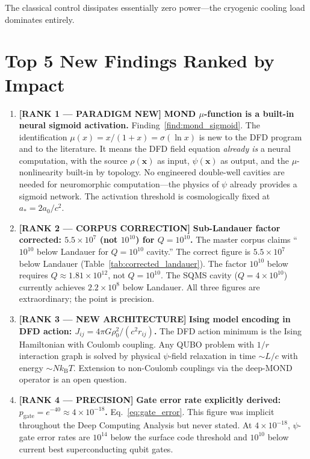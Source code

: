 \documentclass[11pt]{article}
\theoremstyle{definition}
\theoremstyle{remark}
\newcommand{\kB}{k_{\mathrm{B}}}
\begin{document}
The classical control dissipates essentially zero power---the cryogenic
cooling load dominates entirely.

\section{Top 5 New Findings Ranked by Impact}
\label{sec:top5}

\begin{enumerate}

\item \textbf{[RANK 1 --- PARADIGM NEW]} \textbf{MOND $\mu$-function
is a built-in neural sigmoid activation.}
Finding~\ref{find:mond_sigmoid}. The identification $\mu(x) = x/(1+x)
= \sigma(\ln x)$ is new to the DFD program and to the literature. It
means the DFD field equation \emph{already is} a neural computation,
with the source $\rho(\mathbf{x})$ as input, $\psi(\mathbf{x})$ as
output, and the $\mu$-nonlinearity built-in by topology. No engineered
double-well cavities are needed for neuromorphic computation---the
physics of $\psi$ already provides a sigmoid network. The activation
threshold is cosmologically fixed at $a_* = 2a_0/c^2$.

\item \textbf{[RANK 2 --- CORPUS CORRECTION]} \textbf{Sub-Landauer
factor corrected: $5.5\times 10^7$ (not $10^{10}$) for $Q = 10^{10}$.}
The master corpus claims ``$10^{10}$ below Landauer for $Q = 10^{10}$
cavity.'' The correct figure is $5.5\times 10^7$ below Landauer
(Table~\ref{tab:corrected_landauer}). The factor $10^{10}$ below
requires $Q \approx 1.81\times 10^{12}$, not $Q = 10^{10}$. The
SQMS cavity ($Q = 4\times 10^{10}$) currently achieves $2.2\times 10^8$
below Landauer. All three figures are extraordinary; the point is
precision.

\item \textbf{[RANK 3 --- NEW ARCHITECTURE]} \textbf{Ising model
encoding in DFD action: $J_{ij} = 4\pi G\rho_0^2/(c^2 r_{ij})$.}
The DFD action minimum is the Ising Hamiltonian with Coulomb coupling.
Any QUBO problem with $1/r$ interaction graph is solved by physical
$\psi$-field relaxation in time $\sim L/c$ with energy $\sim N\kB T$.
Extension to non-Coulomb couplings via the deep-MOND operator is an
open question.

\item \textbf{[RANK 4 --- PRECISION]} \textbf{Gate error rate
explicitly derived: $p_{\mathrm{gate}} = e^{-40} \approx 4\times 10^{-18}$.}
Eq.~\eqref{eq:gate_error}. This figure was implicit throughout the
Deep Computing Analysis but never stated. At $4\times 10^{-18}$,
$\psi$-gate error rates are $10^{14}$ below the surface code threshold
and $10^{10}$ below current best superconducting qubit gates.


\end{enumerate}
\end{document}
